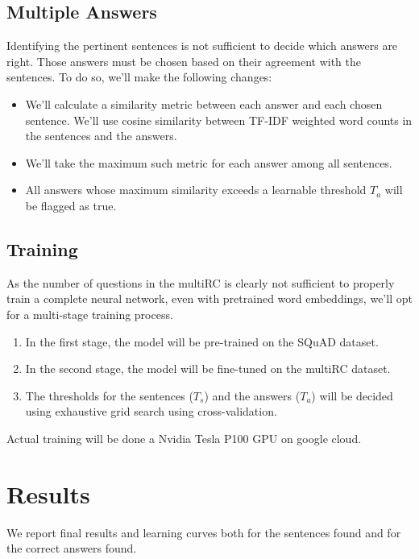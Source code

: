 \documentclass[12pt, a4paper]{article}
\begin{document}
\begin{multicols}{2}
			\subsection{Multiple Answers}
				
				Identifying the pertinent sentences is not sufficient to decide which answers are right. Those answers must be chosen based on their agreement with the sentences. To do so, we'll make the following changes:
				\begin{itemize}
					\item We'll calculate a similarity metric between each answer and each chosen sentence. We'll use cosine similarity between TF-IDF weighted word counts in the sentences and the answers.
					\item We'll take the maximum such metric for each answer among all sentences.
					\item All answers whose maximum similarity exceeds a learnable threshold $ T_a $ will be flagged as true.
				\end{itemize}
		
			\subsection{Training}
				As the number of questions in the multiRC is clearly not sufficient to properly train a complete neural network, even with pretrained word embeddings, we'll opt for a multi-stage training process.
				
				\begin{enumerate}
					\item In the first stage, the model will be pre-trained on the SQuAD dataset.
					\item In the second stage, the model will be fine-tuned on the multiRC dataset.
					\item The thresholds for the sentences ($ T_s $) and the answers ($ T_a $) will be decided using exhaustive grid search using cross-validation.
				\end{enumerate}
				
				Actual training will be done a Nvidia Tesla P100 GPU on google cloud.
			
		\section{Results}
		
			We report final results and learning curves both for the sentences found and for the correct answers found.
			

\end{multicols}
\end{document}
